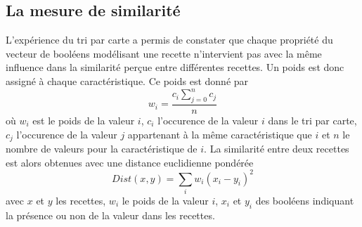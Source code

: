 \documentclass[a4paper, 11pt]{article}
\begin{document}
\subsection{La mesure de similarité}
L'expérience du tri par carte a permis de constater que chaque propriété du vecteur de booléens modélisant une recette n'intervient pas avec la même influence dans la similarité perçue entre différentes recettes. Un poids est donc assigné à chaque caractéristique. Ce poids est donné par 
\begin{equation}
w_{i} = \frac{c_i\sum_{j=0}^{n}c_j}{n}
\end{equation}
où $w_i$ est le poids de la valeur $i$, $c_i$ l'occurence de la valeur $i$ dans le tri par carte, $c_j$ l'occurence de la valeur $j$ appartenant à la même caractéristique que $i$ et $n$ le nombre de valeurs pour la caractéristique de $i$. 
La similarité entre deux recettes est alors obtenues avec une distance euclidienne pondérée 
\begin{equation}
Dist(x,y) = \sum_i w_i(x_i - y_i)^2
\end{equation}
avec $x$ et $y$ les recettes, $w_i$ le poids de la valeur $i$, $x_i$ et $y_i$ des booléens indiquant la présence ou non de la valeur dans les recettes.
\end{document}
